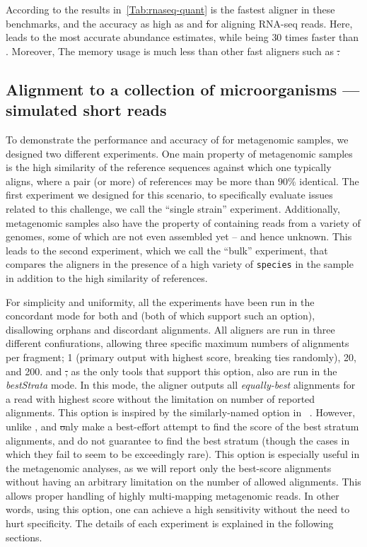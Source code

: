 According to the results in~\cref{Tab:rnaseq-quant} \puffaligner is the fastest aligner in these benchmarks, 
and the accuracy as high as \bt and \st for aligning RNA-seq reads.  Here, \puffaligner leads to the most 
accurate abundance estimates, while being $30$ times faster than \bt. Moreover, The memory usage is much 
less than other fast aligners such as \st.

\subsection{Alignment to a collection of microorganisms --- simulated short reads}

To demonstrate the performance and accuracy of \puffaligner for metagenomic samples, we designed two different 
experiments. One main property of metagenomic samples is the high similarity of the reference sequences against 
which one typically aligns, where a pair (or more) of references may be more than $90\%$ identical.
The first experiment we designed for this scenario, to specifically evaluate issues related to this challenge, 
we call the ``single strain'' experiment. Additionally, metagenomic samples also have the property of containing 
reads from a variety of genomes, some of which are not even assembled yet -- and hence unknown. This leads to 
the second experiment, which we call the ``bulk'' experiment, that compares the aligners in the presence of a 
high variety of \texttt{species} in the sample in addition to the high similarity of references.

For simplicity and uniformity, all the experiments have been run in the concordant mode for both \puffaligner 
and \bt (both of which support such an option), disallowing orphans and discordant alignments.
All aligners are run in three different confiurations, allowing three specific maximum numbers of alignments per 
fragment; 1 (primary output with highest score, breaking ties randomly), 20, and 200.
\puffaligner and \st, as the only tools that support this option, also are run in the \emph{bestStrata} mode.
In this mode, the aligner outputs all \emph{equally-best} alignments for a read with highest score without the 
limitation on number of reported alignments. This option is inspired by the similarly-named option in 
\btie~\citep{langmead2010aligning}. However, unlike \btie, \puffaligner and \st only make a best-effort 
attempt to find the score of the best stratum alignments, and do not guarantee to find the best stratum 
(though the cases in which they fail to seem to be exceedingly rare). This option is especially useful in 
the metagenomic analyses, as we will report only the best-score alignments without having an arbitrary 
limitation on the number of allowed alignments. This allows proper handling of highly multi-mapping 
metagenomic reads. In other words, using this option, one can achieve a high sensitivity without the need to 
hurt specificity. The details of each experiment is explained in the following sections.

